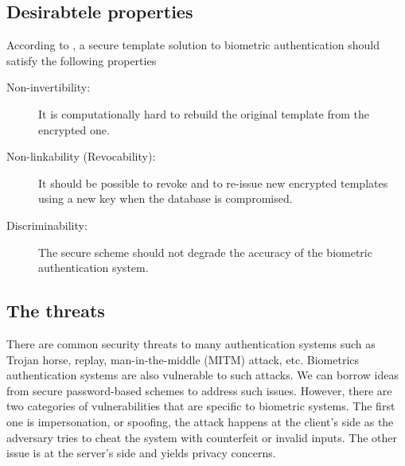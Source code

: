 \subsection{Desirabtele properties}
\label{sec:privacyProps}
According to \cite{jain201650}, a secure template solution to biometric
authentication should satisfy the following properties
\begin{description}
\item[Non-invertibility:] It is computationally hard to rebuild the original
  template from the encrypted one.
\item[Non-linkability (Revocability):] It should be possible to revoke and to
  re-issue new encrypted templates using a new key when the database is
  compromised.
\item[Discriminability:] The secure scheme should not degrade the accuracy of
  the biometric authentication system.
\end{description}
\subsection{The threats}
\label{sec:privacyReqs}
There are common security threats to many authentication systems such as Trojan
horse, replay, man-in-the-middle (MITM) attack, etc. Biometrics authentication
systems are also vulnerable to such attacks. We can borrow ideas from secure
password-based schemes to address such issues. However, there are two categories
of vulnerabilities that are specific to biometric systems.  The first one is
impersonation, or spoofing, the attack happens at the client's side as the
adversary tries to cheat the system with counterfeit or invalid inputs.  The
other issue is at the server's side and yields privacy concerns.

